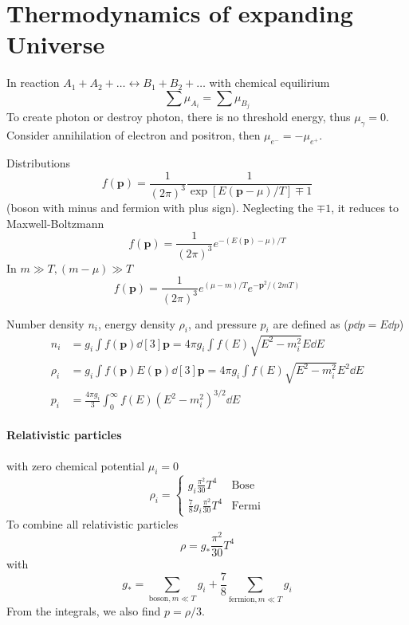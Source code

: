 \documentclass[12pt, a4paper, DIV=15]{article}
\numberwithin{equation}{section}
\begin{document}
\section{Thermodynamics of expanding Universe}
In reaction $A_1 + A_2 + \dots \leftrightarrow B_1 + B_2 + \dots$ with chemical equilirium
\begin{equation}
   \sum \mu_{A_i} = \sum \mu_{B_j}
\end{equation}
To create photon or destroy photon, there is no threshold energy, thus $\mu_\gamma = 0$. Consider annihilation of electron and positron, then $\mu_{e^-} = - \mu_{e^+}$.

Distributions
\begin{equation}
   f(\pmb{p}) = \frac{1}{(2\pi)^3} \frac{1}{\exp[E(\pmb{p}-\mu)/T]  \mp 1} \label{dist}
\end{equation}
(boson with minus and fermion with plus sign). Neglecting the $\mp 1$, it reduces to Maxwell-Boltzmann 
\begin{equation}
   f(\pmb{p}) = \frac{1}{(2\pi)^3} e^{-(E(\pmb{p})-\mu)/T}
\end{equation}
In $m \gg T, (m - \mu) \gg T$
\begin{equation}
   f(\pmb{p}) = \frac{1}{(2\pi)^3} e^{(\mu - m)/T} e^{- \pmb{p}^2/(2mT)}
\end{equation}

Number density $n_i$, energy density $\rho_i$, and pressure $p_i$ are defined as ($p\dd{p} = E \dd{p}$)
\begin{align}
   n_i &= g_i \int f(\pmb{p}) \dd[3]{\pmb{p}} = 4\pi g_i \int f(E) \sqrt{E^2 - m_i^2} E \dd{E} \\
   \rho_i &= g_i \int f(\pmb{p}) E(\pmb{p}) \dd[3]{\pmb{p}} = 4\pi g_i \int f(E) \sqrt{E^2 - m_i^2} E^2 \dd{E} \\
   p_i &= \frac{4\pi g_i}{3} \int^\infty_0 f(E) (E^2 - m_i^2)^{3/2} \dd{E}
\end{align}

\paragraph{Relativistic particles} with zero chemical potential $\mu_i = 0$
\begin{equation}
   \rho_i = 
   \begin{cases}
      g_i \frac{\pi^2}{30} T^4 & \text{Bose} \\
      \frac{7}{8} g_i \frac{\pi^2}{30} T^4 & \text{Fermi}
   \end{cases}
\end{equation}
To combine all relativistic particles
\begin{equation}
   \rho = g_* \frac{\pi^2}{30} T^4
\end{equation}
with
\begin{equation}
   g_* = \sum_{\text{boson}, m \ll T} g_i + \frac{7}{8} \sum_{\text{fermion}, m \ll T} g_i
\end{equation}
From the integrals, we also find $p = \rho / 3$.
\end{document}
